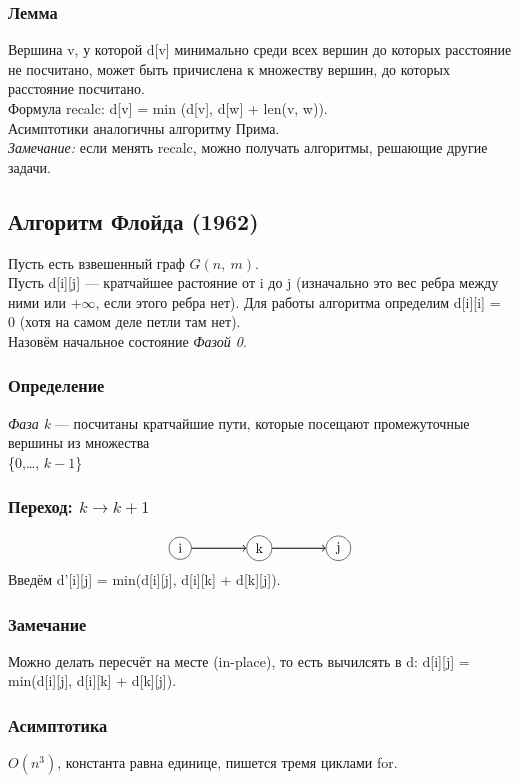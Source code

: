 \documentclass[12pt, a4paper]{article}
\begin{document}
    \subsubsection*{Лемма}
    Вершина v, у которой d[v] минимально среди всех вершин до которых расстояние не посчитано,
    может быть причислена к множеству вершин, до которых расстояние посчитано.\\
    Формула recalc: d[v] = min (d[v], d[w] + len(v, w)).\\
    Асимптотики аналогичны алгоритму Прима.\\
    \textit{Замечание:} если менять recalc, можно получать алгоритмы, решающие другие задачи.
    \subsection{Алгоритм Флойда (1962)}
    Пусть есть взвешенный граф $G(n,\ m)$.\\
    Пусть d[i][j] --- кратчайшее растояние от i до j (изначально это вес ребра между ними или $+\infty$, если этого ребра нет). Для работы алгоритма определим d[i][i] = 0 (хотя на самом деле петли там нет).\\
    Назовём начальное состояние \textit{Фазой 0}.
    \subsubsection*{Определение}
    \textit{Фаза k} --- посчитаны кратчайшие пути, которые посещают промежуточные вершины из множества\\
    \{0,\dots, $k - 1$\}
    \subsubsection*{Переход: $k\to k + 1$}
    \[\begin{tikzpicture}[every circle node/.style={draw}]
        \draw (-2, 0) node[circle](0){i};
        \draw (0, 0) node[circle](1){k};
        \draw (2, 0) node[circle](2){j};
        \draw[->, thick] (0) -- (1);
        \draw[->, thick] (1) -- (2);
    \end{tikzpicture}\]
    Введём d'[i][j] = min(d[i][j], d[i][k] + d[k][j]).
    \subsubsection*{Замечание}
    Можно делать пересчёт на месте (in-place), то есть вычилсять в d: d[i][j] = min(d[i][j], d[i][k] + d[k][j]).
    \subsubsection*{Асимптотика}
    $O(n^3)$, константа равна единице, пишется тремя циклами for.
\end{document}
